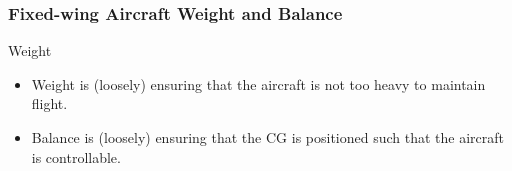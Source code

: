 \begin{frame}
\frametitle{Fixed-wing Aircraft Weight and Balance}
\begin{block}{Weight}
\begin{itemize}
\item Weight is (loosely) ensuring that the aircraft is not too heavy to maintain flight.
\item Balance is (loosely) ensuring that the CG is positioned such that the aircraft is controllable.
\end{itemize}
\end{block}
\end{frame}

